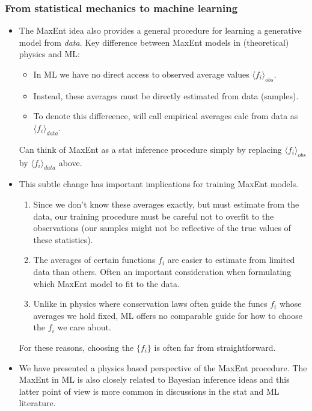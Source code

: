 \documentclass[norsk,a4paper,11pt]{article}
\begin{document}
\subsubsection{From statistical mechanics to machine learning}
\begin{itemize}
	\item The MaxEnt idea also provides a general procedure for learning a generative model from \textit{data}. Key difference between MaxEnt models in (theoretical) physics and ML:
	\begin{itemize} 
		\item In ML we have no direct access to observed average values $\langle f_i \rangle_{obs}$.
		\item Instead, these averages must be directly estimated from data (samples). 
		\item To denote this differeence, will call empirical averages calc from data as $\langle f_i \rangle_{data}$.
	\end{itemize}
	Can think of MaxEnt as a stat inference procedure simply by replacing $\langle f_i \rangle_{obs}$ by $\langle f_i \rangle_{data}$ above.
	\item This subtle change has important implications for training MaxEnt models.
	\begin{enumerate}
		\item Since we don't know these averages exactly, but must estimate from the data, our training procedure must be careful not to overfit to the observations (our samples might not be reflective of the true values of these statistics).
		\item The averages of certain functions $f_i$ are easier to estimate from limited data than others. Often an important consideration when formulating which MaxEnt model to fit to the data.
		\item Unlike in physics where conservation laws often guide the funcs $f_i$ whose averages we hold fixed, ML offers no comparable guide for how to choose the $f_i$ we care about. 
	\end{enumerate}
	For these reasons, choosing the $\{ f_i \}$ is often far from straightforward. 
	\item We have presented a physics based perspective of the MaxEnt procedure. The MaxEnt in ML is also closely related to Bayesian inference ideas and this latter point of view is more common in discussions in the stat and ML literature.
\end{itemize}
\end{document}
